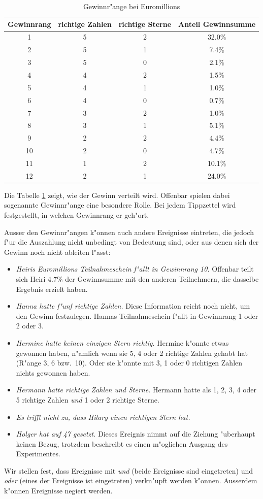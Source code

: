 \begin{table}
\begin{center}
\begin{tabular}{|c|c|c|c|}
\hline
Gewinnrang&richtige Zahlen&richtige Sterne&Anteil Gewinnsumme\\
\hline
1&5&2&32.0\%\\
2&5&1&7.4\%\\
3&5&0&2.1\%\\
4&4&2&1.5\%\\
5&4&1&1.0\%\\
6&4&0&0.7\%\\
7&3&2&1.0\%\\
8&3&1&5.1\%\\
9&2&2&4.4\%\\
10&2&0&4.7\%\\
11&1&2&10.1\%\\
12&2&1&24.0\%\\
\hline
\end{tabular}
\end{center}
\caption{Gewinnr"ange bei Euromillions\label{gewinnraenge}}
\end{table}

Die Tabelle \ref{gewinnraenge} zeigt, wie der Gewinn verteilt wird.
Offenbar spielen dabei sogenannte Gewinnr"ange eine besondere Rolle.
Bei jedem Tippzettel wird festgestellt, in welchen Gewinnrang er
geh"ort.

Ausser den Gewinnr"angen k"onnen auch andere Ereignisse eintreten,
die jedoch f"ur die Auszahlung nicht unbedingt von Bedeutung sind,
oder aus denen sich der Gewinn noch nicht ableiten l"asst:
\begin{itemize}
\item {\it Heiris Euromillions Teilnahmeschein f"allt in Gewinnrang 10.}
Offenbar teilt sich Heiri 4.7\% der Gewinnsumme mit den anderen Teilnehmern,
die dasselbe Ergebnis erzielt haben.
\item {\it Hanna hatte f"unf richtige Zahlen.}
Diese Information reicht noch nicht, um den Gewinn festzulegen.
Hannas Teilnahmeschein f"allt in Gewinnrang 1 oder 2 oder 3.
\item {\it Hermine hatte keinen einzigen Stern richtig.}
Hermine k"onnte
etwas gewonnen haben, n"amlich wenn sie 5, 4 oder 2 richtige Zahlen
gehabt hat (R"ange 3, 6 bzw.~10).
Oder sie k"onnte mit 3, 1 oder 0 richtigen Zahlen nichts gewonnen haben.
\item {\it Hermann hatte richtige Zahlen und Sterne.}
Hermann hatte als 1, 2, 3, 4 oder 5 richtige Zahlen {\em und}
1 oder 2 richtige Sterne.
\item {\it Es trifft nicht zu, dass Hilary einen richtigen Stern hat.}
\item {\it Holger hat auf 47 gesetzt.}
Dieses Ereignis nimmt auf die Ziehung "uberhaupt keinen Bezug,
trotzdem beschreibt es einen m"oglichen Ausgang des Experimentes.
\end{itemize}
Wir stellen fest, dass Ereignisse mit {\em und} (beide Ereignisse sind
eingetreten) und {\em oder} (eines der Ereignisse ist
eingetreten) verkn"upft werden k"onnen.
Ausserdem k"onnen Ereignisse negiert werden.

